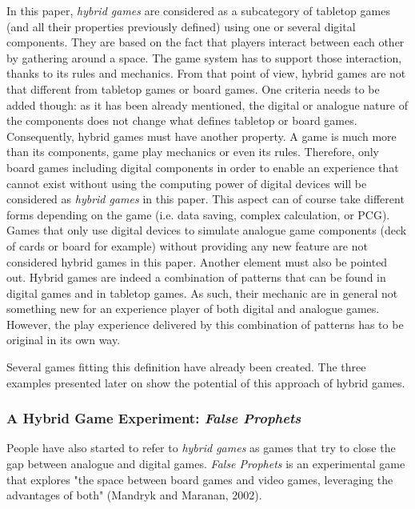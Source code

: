In this paper, \textit{hybrid games} are considered as a subcategory of tabletop games (and all their properties previously defined) using one or several digital components. They are based on the fact that players interact between each other by gathering around a space. The game system has to support those interaction, thanks to its rules and mechanics. From that point of view, hybrid games are not that different from tabletop games or board games. One criteria needs to be added though: as it has been already mentioned, the digital or analogue nature of the components does not change what defines tabletop or board games. Consequently, hybrid games must have another property. A game is much more than its components, game play mechanics or even its rules. Therefore, only board games including digital components in order to enable an experience that cannot exist without using the computing power of digital devices will be considered as \textit{hybrid games} in this paper. This aspect can of course take different forms depending on the game (i.e. data saving, complex calculation, or PCG). Games that only use digital devices to simulate analogue game components (deck of cards or board for example) without providing any new feature are not considered hybrid games in this paper. Another element must also be pointed out. Hybrid games are indeed a combination of patterns that can be found in digital games and in tabletop games. As such, their mechanic are in general not something new for an experience player of both digital and analogue games. However, the play experience delivered by this combination of patterns has to be original in its own way.

Several games fitting this definition have already been created. The three examples presented later on show the potential of this approach of hybrid games.

\subsubsection{A Hybrid Game Experiment: \textit{False Prophets}}
People have also started to refer to \textit{hybrid games} as games that try to close the gap between analogue and digital games. \textit{False Prophets} is an experimental game that explores "the space between board games and video games, leveraging the advantages of both" (Mandryk and Maranan, 2002)\cite{art:prophets}. 

